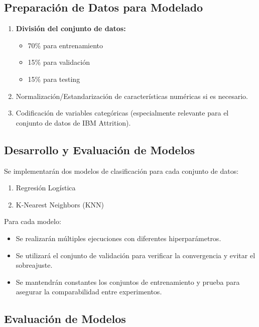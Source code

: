 \documentclass[conference]{IEEEtran}
\begin{document}
\subsection{Preparación de Datos para Modelado}

\begin{enumerate}
    \item \textbf{División del conjunto de datos:}
    \begin{itemize}
        \item 70\% para entrenamiento
        \item 15\% para validación
        \item 15\% para testing
    \end{itemize}
    \item Normalización/Estandarización de características numéricas si es necesario.
    \item Codificación de variables categóricas (especialmente relevante para el conjunto de datos de IBM Attrition).
\end{enumerate}

\subsection{Desarrollo y Evaluación de Modelos}

Se implementarán dos modelos de clasificación para cada conjunto de datos:

\begin{enumerate}
    \item Regresión Logística
    \item K-Nearest Neighbors (KNN)
\end{enumerate}

Para cada modelo:
\begin{itemize}
    \item Se realizarán múltiples ejecuciones con diferentes hiperparámetros.
    \item Se utilizará el conjunto de validación para verificar la convergencia y evitar el sobreajuste.
    \item Se mantendrán constantes los conjuntos de entrenamiento y prueba para asegurar la comparabilidad entre experimentos.
\end{itemize}

\subsection{Evaluación de Modelos}
\end{document}
